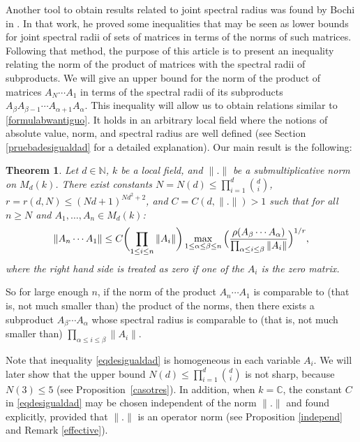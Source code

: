 \documentclass[11pt]{article}
\theoremstyle{plain}
\newtheorem{teo}{Theorem}[section]
\theoremstyle{definition}
\newcommand{\NN}{\mathbb{N}}
\newcommand{\CC}{\mathbb{C}}
\begin{document}
Another tool to obtain results related to joint spectral radius was found by Bochi in \cite{bociineq}. In that work, he proved some inequalities that may be seen as lower bounds for joint spectral radii of sets of matrices in terms of the norms of such matrices. Following that method, the purpose of this article is to present an inequality relating the norm of the product of matrices with the spectral radii of subproducts. We will give an upper bound for the norm of the product of matrices $A_N\cdots A_1$ in terms of the spectral radii of its subproducts $A_{\beta}A_{\beta-1}\cdots A_{\alpha+1}A_{\alpha}$. This inequality will allow us to obtain relations similar to \eqref{formulabwantiguo}. It holds in an arbitrary local field where the notions of absolute value, norm, and spectral radius are well defined (see Section \ref{pruebadesigualdad} for a detailed explanation). Our main result is the following:

\begin{teo}\label{desigualdad} Let $d \in \NN$, $k$ be a local field, and $\|.\|$ be a submultiplicative norm on $M_{d}(k)$. There exist constants $N = N(d)\leq \prod^{d}_{i=1}{\binom{d}{i}}$, $r = r(d,N) \leq (Nd+1)^{Nd^2+2}$, and $C = C(d,\|.\|) > 1$ such that for all $n\geq N$ and $A_1,\dots, A_n \in M_{d}(k)$:
\begin{equation}\label{eqdesigualdad}
\|A_n\cdots A_1\| \leq C \biggl(\prod_{1\leq i\leq n}{\|A_i\|}\biggr)\max_{1\leq \alpha\leq \beta\leq n}{ \Bigl( \frac{\rho(A_{\beta}\cdots A_{\alpha}) }{ \prod_{\alpha\leq i\leq \beta}{\|A_i\|}} \Bigr)^{1/r}},
\end{equation}
where the right hand side is treated as zero if one of the $A_{i}$ is the zero matrix.
\end{teo}
So for large enough $n$, if the norm of the product $A_n\cdots A_1$ is comparable to (that is, not much smaller than) the product of the norms, then there exists a subproduct $A_{\beta}\cdots A_{\alpha}$ whose spectral radius is comparable to (that is, not much smaller than) $\prod_{\alpha\leq i \leq \beta}{\|A_{i}\|}$.

Note that inequality \eqref{eqdesigualdad} is homogeneous in each variable $A_{i}$. We will later show that the upper bound $N(d)\leq \prod^{d}_{i=1}{\binom{d}{i}}$ is not sharp, because $N(3)\leq 5$ (see Proposition~\ref{casotres}). In addition, when $k=\CC$, the constant $C$ in \eqref{eqdesigualdad} may be chosen independent of the norm $\|.\|$ and found explicitly, provided that $\|.\|$ is an operator norm (see Proposition \ref{independ} and Remark \ref{effective}).
\end{document}
